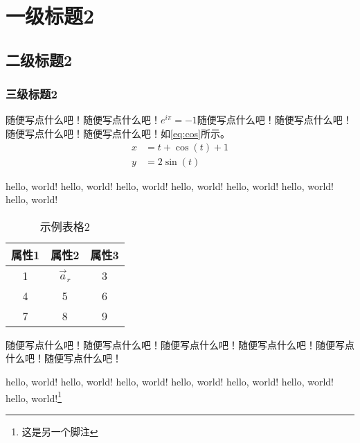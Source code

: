 \chapter{一级标题2}
\section{二级标题2}
\subsection{三级标题2}
随便写点什么吧！随便写点什么吧！$e^{i\pi}=-1$随便写点什么吧！随便写点什么吧！随便写点什么吧！随便写点什么吧！如\ref{eq:cos}所示。
\begin{align}
    x &=t+\cos(t)  + 1 \label{eq:cos}  \\
    y &=2\sin(t)
\end{align}


hello, world! hello, world! hello, world! hello, world! hello, world! hello, world! hello, world!

\begin{table}[h]

\caption{示例表格2}
\begin{center}
    \begin{tabular}{ccc} 
    \toprule
    \textbf{属性1} & \textbf{属性2} & \textbf{属性3} \\ \midrule
    1            & $\Vec{a}_r$  & 3            \\
    4            & 5            & 6            \\
    7            & 8            & 9            \\ \bottomrule
    \end{tabular}
\end{center}\label{tab:exp_table2}

\end{table}

随便写点什么吧！随便写点什么吧！随便写点什么吧！随便写点什么吧！随便写点什么吧！随便写点什么吧！

hello, world! hello, world! hello, world! hello, world! hello, world! hello, world! hello, world!\footnote{这是另一个脚注}
